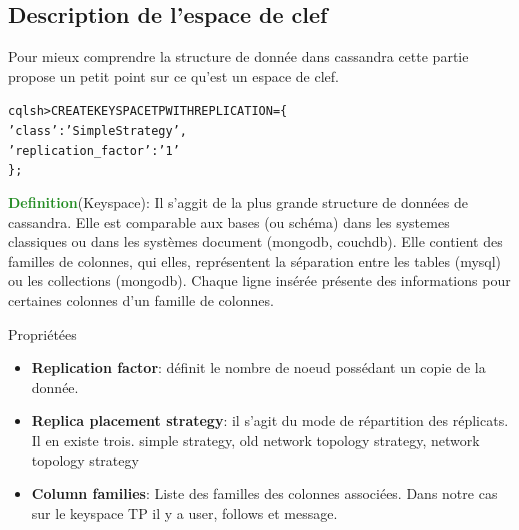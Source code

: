 \subsection{Description de l'espace de clef}
\par Pour mieux comprendre la structure de donnée dans cassandra
cette partie propose un petit point sur ce qu'est un espace de clef.\newline

\begin{tt}
\begin{alltt}
cqlsh> CREATE KEYSPACE TP WITH REPLICATION = \{
\indent		'class' : 'SimpleStrategy',
\indent		'replication\_factor' : '1'
\};
\end{alltt}
\end{tt}

\textcolor{ForestGreen}{\textbf{Definition}}(Keyspace): Il s'aggit de la plus grande 
structure de données de cassandra. Elle est comparable aux bases (ou schéma)
dans les systemes classiques ou dans les systèmes document (mongodb, couchdb). Elle contient des familles de colonnes,  qui elles, représentent
la séparation entre les tables (mysql) ou les collections (mongodb). Chaque ligne insérée présente des informations pour certaines colonnes
d'un famille de colonnes.

\begin{block}{Propriétées}
\begin{itemize}
\item \textbf{Replication factor}: définit le nombre de noeud possédant un copie de la donnée. 
\item \textbf{Replica placement strategy}: il s'agit du mode de répartition des réplicats. Il en 
existe trois. simple strategy,  old network topology strategy, network topology strategy
\item \textbf{Column families}: Liste des familles des colonnes associées. Dans notre cas sur le keyspace
TP il y a user, follows et message.
\end{itemize}
\end{block}


